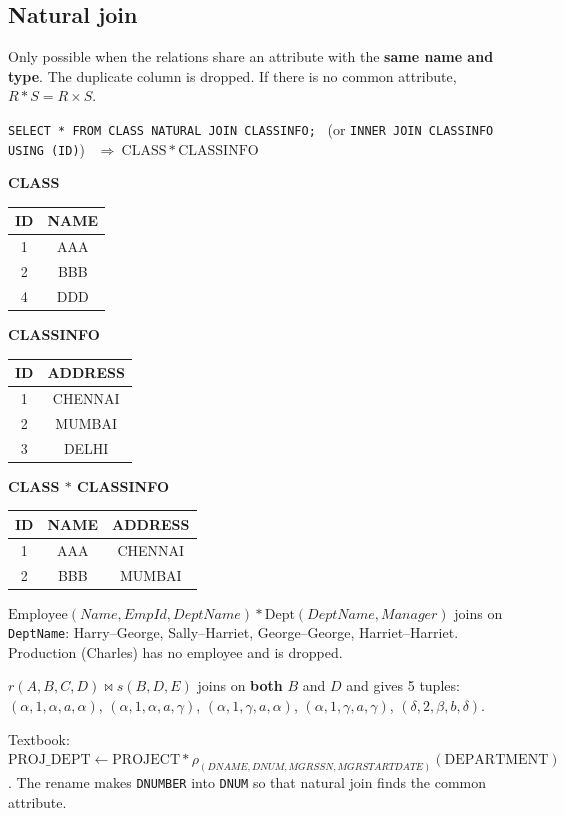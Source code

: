 \documentclass[10pt,a4paper]{article}
\newcommand{\R}[1]{\mathrm{#1}}          %
\begin{document}
\subsection{Natural join}
Only possible when the relations share an attribute with the \textbf{same name and type}. The duplicate column is dropped. If there is no common attribute, $R * S = R \times S$.
\begin{exbox}[Slides 235--237]
\small
\texttt{SELECT * FROM CLASS NATURAL JOIN CLASSINFO;} \ (or \texttt{INNER JOIN CLASSINFO USING (ID)}) \ $\Rightarrow\ \R{CLASS} * \R{CLASSINFO}$

\smallskip
\begin{minipage}[t]{0.2\linewidth}\centering
\textbf{CLASS}\\\begin{tabular}{cc}\toprule ID&NAME\\\midrule 1&AAA\\2&BBB\\4&DDD\\\bottomrule\end{tabular}
\end{minipage}\hfill
\begin{minipage}[t]{0.24\linewidth}\centering
\textbf{CLASSINFO}\\\begin{tabular}{cc}\toprule ID&ADDRESS\\\midrule 1&CHENNAI\\2&MUMBAI\\3&DELHI\\\bottomrule\end{tabular}
\end{minipage}\hfill
\begin{minipage}[t]{0.3\linewidth}\centering
\textbf{CLASS $*$ CLASSINFO}\\\begin{tabular}{ccc}\toprule ID&NAME&ADDRESS\\\midrule 1&AAA&CHENNAI\\2&BBB&MUMBAI\\\bottomrule\end{tabular}
\end{minipage}

\smallskip
$\R{Employee}(Name, EmpId, DeptName) * \R{Dept}(DeptName, Manager)$ joins on \texttt{DeptName}: Harry--George, Sally--Harriet, George--George, Harriet--Harriet. Production (Charles) has no employee and is dropped.

$r(A,B,C,D) \bowtie s(B,D,E)$ joins on \textbf{both} $B$ and $D$ and gives 5 tuples: $(\alpha,1,\alpha,a,\alpha)$, $(\alpha,1,\alpha,a,\gamma)$, $(\alpha,1,\gamma,a,\alpha)$, $(\alpha,1,\gamma,a,\gamma)$, $(\delta,2,\beta,b,\delta)$.

Textbook: $\R{PROJ\_DEPT} \leftarrow \R{PROJECT} * \rho_{(DNAME,DNUM,MGRSSN,MGRSTARTDATE)}(\R{DEPARTMENT})$. The rename makes \texttt{DNUMBER} into \texttt{DNUM} so that natural join finds the common attribute.
\end{exbox}
\end{document}
